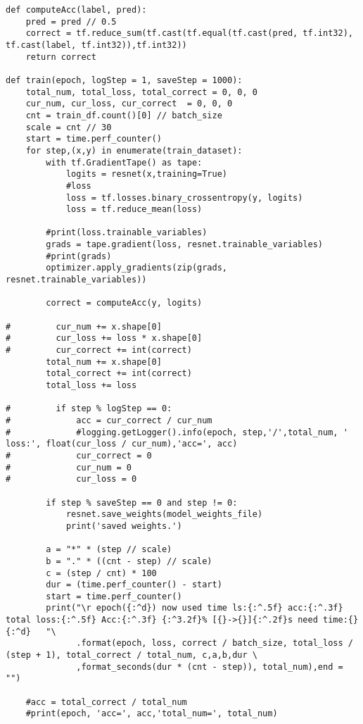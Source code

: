 \begin{verbatim}
def computeAcc(label, pred):
    pred = pred // 0.5
    correct = tf.reduce_sum(tf.cast(tf.equal(tf.cast(pred, tf.int32), tf.cast(label, tf.int32)),tf.int32))
    return correct

def train(epoch, logStep = 1, saveStep = 1000):
    total_num, total_loss, total_correct = 0, 0, 0
    cur_num, cur_loss, cur_correct  = 0, 0, 0
    cnt = train_df.count()[0] // batch_size
    scale = cnt // 30
    start = time.perf_counter()
    for step,(x,y) in enumerate(train_dataset):
        with tf.GradientTape() as tape:
            logits = resnet(x,training=True)
            #loss
            loss = tf.losses.binary_crossentropy(y, logits)
            loss = tf.reduce_mean(loss)

        #print(loss.trainable_variables)
        grads = tape.gradient(loss, resnet.trainable_variables)
        #print(grads)
        optimizer.apply_gradients(zip(grads, resnet.trainable_variables))

        correct = computeAcc(y, logits)

#         cur_num += x.shape[0]
#         cur_loss += loss * x.shape[0]
#         cur_correct += int(correct)
        total_num += x.shape[0]
        total_correct += int(correct)
        total_loss += loss

#         if step % logStep == 0:
#             acc = cur_correct / cur_num
#             #logging.getLogger().info(epoch, step,'/',total_num, ' loss:', float(cur_loss / cur_num),'acc=', acc)
#             cur_correct = 0
#             cur_num = 0
#             cur_loss = 0

        if step % saveStep == 0 and step != 0:
            resnet.save_weights(model_weights_file)
            print('saved weights.')

        a = "*" * (step // scale)
        b = "." * ((cnt - step) // scale)
        c = (step / cnt) * 100
        dur = (time.perf_counter() - start)
        start = time.perf_counter()
        print("\r epoch({:^d}) now used time ls:{:^.5f} acc:{:^.3f} total loss:{:^.5f} Acc:{:^.3f} {:^3.2f}% [{}->{}]{:^.2f}s need time:{} {:^d}   "\
              .format(epoch, loss, correct / batch_size, total_loss / (step + 1), total_correct / total_num, c,a,b,dur \
              ,format_seconds(dur * (cnt - step)), total_num),end = "")

    #acc = total_correct / total_num
    #print(epoch, 'acc=', acc,'total_num=', total_num)


\end{verbatim}
